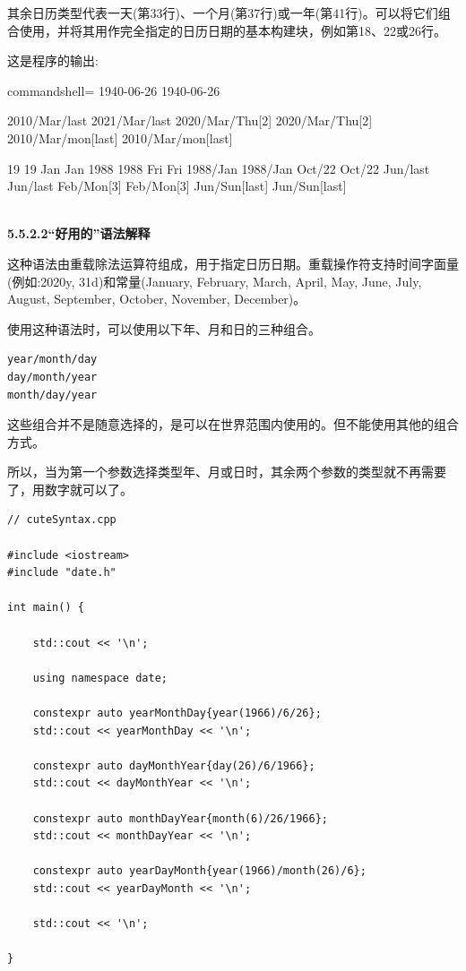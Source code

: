 其余日历类型代表一天(第33行)、一个月(第37行)或一年(第41行)。可以将它们组合使用，并将其用作完全指定的日历日期的基本构建块，例如第18、22或26行。

这是程序的输出:

\begin{tcblisting}{commandshell={}}
1940-06-26 1940-06-26

2010/Mar/last 2021/Mar/last
2020/Mar/Thu[2] 2020/Mar/Thu[2]
2010/Mar/mon[last] 2010/Mar/mon[last]

19 19
Jan Jan
1988 1988
Fri Fri
1988/Jan 1988/Jan
Oct/22 Oct/22
Jun/last Jun/last
Feb/Mon[3] Feb/Mon[3]
Jun/Sun[last] Jun/Sun[last]
\end{tcblisting}

\hspace*{\fill} \\ %
\noindent
\textbf{5.5.2.2\hspace{0.2cm}“好用的”语法解释}

这种语法由重载除法运算符组成，用于指定日历日期。重载操作符支持时间字面量(例如:2020y, 31d)和常量(January, February, March, April, May, June, July, August, September, October, November, December)。

使用这种语法时，可以使用以下年、月和日的三种组合。

\begin{lstlisting}[style=styleCXX]
year/month/day
day/month/year
month/day/year
\end{lstlisting}

这些组合并不是随意选择的，是可以在世界范围内使用的。但不能使用其他的组合方式。

所以，当为第一个参数选择类型年、月或日时，其余两个参数的类型就不再需要了，用数字就可以了。

\begin{lstlisting}[style=styleCXX]
// cuteSyntax.cpp

#include <iostream>
#include "date.h"

int main() {
	
	std::cout << '\n';
	
	using namespace date;
	
	constexpr auto yearMonthDay{year(1966)/6/26};
	std::cout << yearMonthDay << '\n';
	
	constexpr auto dayMonthYear{day(26)/6/1966};
	std::cout << dayMonthYear << '\n';
	
	constexpr auto monthDayYear{month(6)/26/1966};
	std::cout << monthDayYear << '\n';
	
	constexpr auto yearDayMonth{year(1966)/month(26)/6};
	std::cout << yearDayMonth << '\n';
	
	std::cout << '\n';

}
\end{lstlisting}

